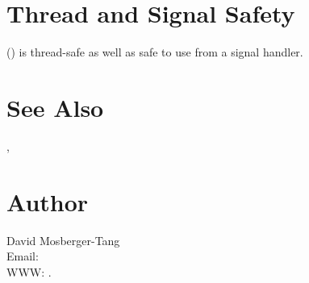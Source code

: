 \documentclass{article}
\begin{document}
\section{Thread and Signal Safety}

() is thread-safe as well as safe to use
from a signal handler.

\section{See Also}

,

\section{Author}

\noindent
David Mosberger-Tang\\
Email: \\
WWW: .
\LatexManEnd
\end{document}
